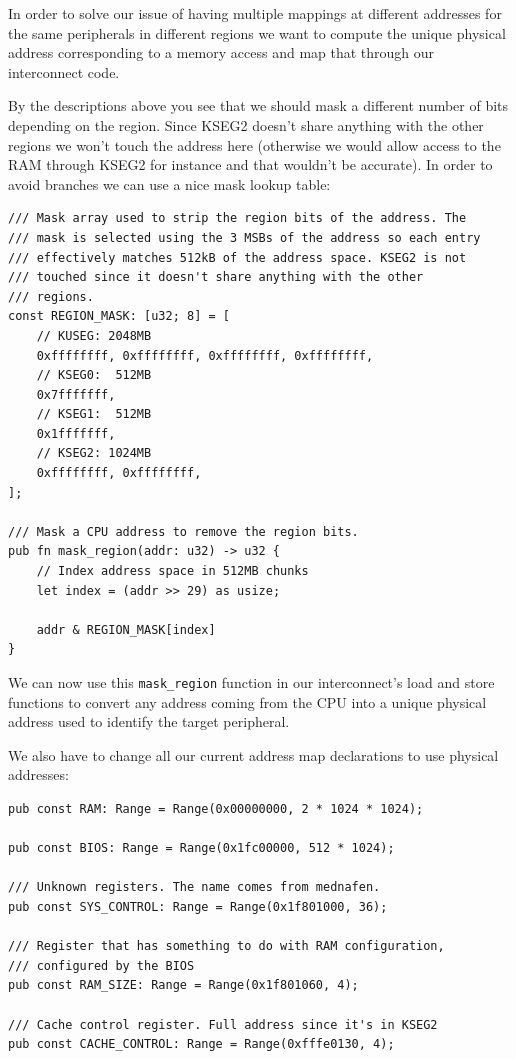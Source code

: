\documentclass[a4paper]{article}
\newcommand{\code}[1] {\texttt{#1}}
\begin{document}
In order to solve our issue of having multiple mappings at different
addresses for the same peripherals in different regions we want to
compute the unique physical address corresponding to a memory access
and map that through our interconnect code.

By the descriptions above you see that we should mask a different
number of bits depending on the region. Since KSEG2 doesn't share
anything with the other regions we won't touch the address here
(otherwise we would allow access to the RAM through KSEG2 for instance
and that wouldn't be accurate). In order to avoid branches we can use
a nice mask lookup table:

\begin{lstlisting}
/// Mask array used to strip the region bits of the address. The
/// mask is selected using the 3 MSBs of the address so each entry
/// effectively matches 512kB of the address space. KSEG2 is not
/// touched since it doesn't share anything with the other
/// regions.
const REGION_MASK: [u32; 8] = [
    // KUSEG: 2048MB
    0xffffffff, 0xffffffff, 0xffffffff, 0xffffffff,
    // KSEG0:  512MB
    0x7fffffff,
    // KSEG1:  512MB
    0x1fffffff,
    // KSEG2: 1024MB
    0xffffffff, 0xffffffff,
];

/// Mask a CPU address to remove the region bits.
pub fn mask_region(addr: u32) -> u32 {
    // Index address space in 512MB chunks
    let index = (addr >> 29) as usize;

    addr & REGION_MASK[index]
}
\end{lstlisting}

We can now use this \code{mask\_region} function in our interconnect's
load and store functions to convert any address coming from the CPU
into a unique physical address used to identify the target peripheral.

We also have to change all our current address map declarations to use
physical addresses:

\begin{lstlisting}
pub const RAM: Range = Range(0x00000000, 2 * 1024 * 1024);

pub const BIOS: Range = Range(0x1fc00000, 512 * 1024);

/// Unknown registers. The name comes from mednafen.
pub const SYS_CONTROL: Range = Range(0x1f801000, 36);

/// Register that has something to do with RAM configuration,
/// configured by the BIOS
pub const RAM_SIZE: Range = Range(0x1f801060, 4);

/// Cache control register. Full address since it's in KSEG2
pub const CACHE_CONTROL: Range = Range(0xfffe0130, 4);
\end{lstlisting}
\end{document}
